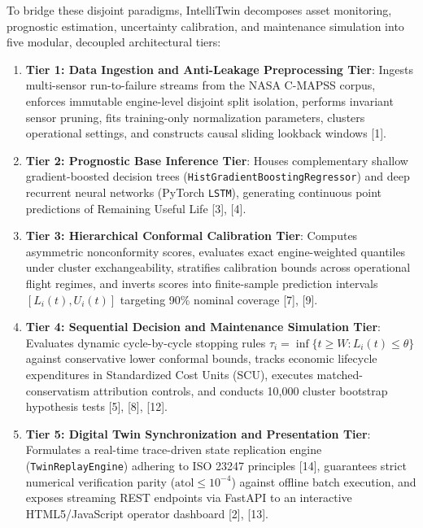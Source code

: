\documentclass[12pt,a4paper]{article}
\begin{document}
To bridge these disjoint paradigms, IntelliTwin decomposes asset monitoring, prognostic estimation, uncertainty calibration, and maintenance simulation into five modular, decoupled architectural tiers:
\begin{enumerate}
    \item \textbf{Tier 1: Data Ingestion and Anti-Leakage Preprocessing Tier}: Ingests multi-sensor run-to-failure streams from the NASA C-MAPSS corpus, enforces immutable engine-level disjoint split isolation, performs invariant sensor pruning, fits training-only normalization parameters, clusters operational settings, and constructs causal sliding lookback windows [1].
    \item \textbf{Tier 2: Prognostic Base Inference Tier}: Houses complementary shallow gradient-boosted decision trees (\texttt{HistGradientBoostingRegressor}) and deep recurrent neural networks (PyTorch \texttt{LSTM}), generating continuous point predictions of Remaining Useful Life [3], [4].
    \item \textbf{Tier 3: Hierarchical Conformal Calibration Tier}: Computes asymmetric nonconformity scores, evaluates exact engine-weighted quantiles under cluster exchangeability, stratifies calibration bounds across operational flight regimes, and inverts scores into finite-sample prediction intervals $[L_i(t), U_i(t)]$ targeting 90\% nominal coverage [7], [9].
    \item \textbf{Tier 4: Sequential Decision and Maintenance Simulation Tier}: Evaluates dynamic cycle-by-cycle stopping rules $\tau_i = \inf \{ t \ge W : L_i(t) \le \theta \}$ against conservative lower conformal bounds, tracks economic lifecycle expenditures in Standardized Cost Units (SCU), executes matched-conservatism attribution controls, and conducts 10,000 cluster bootstrap hypothesis tests [5], [8], [12].
    \item \textbf{Tier 5: Digital Twin Synchronization and Presentation Tier}: Formulates a real-time trace-driven state replication engine (\texttt{TwinReplayEngine}) adhering to ISO 23247 principles [14], guarantees strict numerical verification parity ($\text{atol} \le 10^{-4}$) against offline batch execution, and exposes streaming REST endpoints via FastAPI to an interactive HTML5/JavaScript operator dashboard [2], [13].
\end{enumerate}
\end{document}
